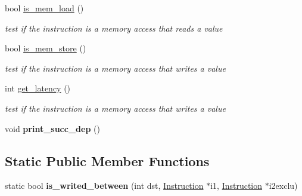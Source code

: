 \begin{DoxyCompactItemize}
\item 
\hypertarget{classInstruction_aee32f4bb91480afc74375beb139af4d6}{bool \hyperlink{classInstruction_aee32f4bb91480afc74375beb139af4d6}{is\-\_\-mem\-\_\-load} ()}\label{classInstruction_aee32f4bb91480afc74375beb139af4d6}

\begin{DoxyCompactList}\small\item\em test if the instruction is a memory access that reads a value \end{DoxyCompactList}\item 
\hypertarget{classInstruction_a4455144397d239eb61bcfa2b0e16bf67}{bool \hyperlink{classInstruction_a4455144397d239eb61bcfa2b0e16bf67}{is\-\_\-mem\-\_\-store} ()}\label{classInstruction_a4455144397d239eb61bcfa2b0e16bf67}

\begin{DoxyCompactList}\small\item\em test if the instruction is a memory access that writes a value \end{DoxyCompactList}\item 
\hypertarget{classInstruction_ac2988d2fb858b720e009da03120ae4c7}{int \hyperlink{classInstruction_ac2988d2fb858b720e009da03120ae4c7}{get\-\_\-latency} ()}\label{classInstruction_ac2988d2fb858b720e009da03120ae4c7}

\begin{DoxyCompactList}\small\item\em test if the instruction is a memory access that writes a value \end{DoxyCompactList}\item 
\hypertarget{classInstruction_af489e680ae3c69fd12b0a23e959172e5}{void {\bfseries print\-\_\-succ\-\_\-dep} ()}\label{classInstruction_af489e680ae3c69fd12b0a23e959172e5}

\end{DoxyCompactItemize}
\subsection*{\-Static \-Public \-Member \-Functions}
\begin{DoxyCompactItemize}
\item 
\hypertarget{classInstruction_ae309ff37d134500f75e1180182b02a6b}{static bool {\bfseries is\-\_\-writed\-\_\-between} (int dst, \hyperlink{classInstruction}{\-Instruction} $\ast$i1, \hyperlink{classInstruction}{\-Instruction} $\ast$i2exclu)}\label{classInstruction_ae309ff37d134500f75e1180182b02a6b}

\end{DoxyCompactItemize}


